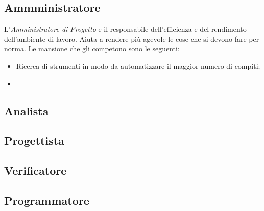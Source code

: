 \subsection{Ammministratore}
L'\textit{Amministratore di Progetto} e il responsabile dell'efficienza e del rendimento dell'ambiente di lavoro. Aiuta a rendere più agevole le cose che si devono fare per norma. Le mansione che gli competono sono le seguenti:
\begin{itemize}
	\item Ricerca di strumenti in modo da automatizzare il maggior numero di compiti;
	\item 
\end{itemize}
\subsection{Analista}

\subsection{Progettista}

\subsection{Verificatore}

\subsection{Programmatore}
